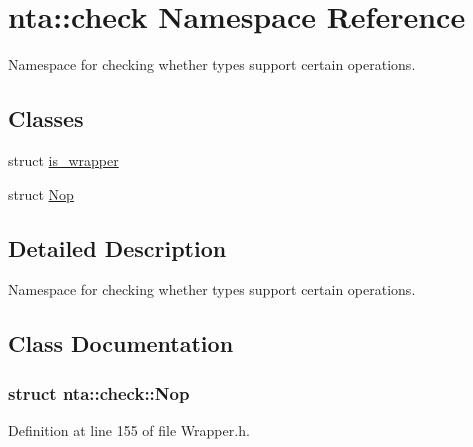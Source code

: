\hypertarget{namespacenta_1_1check}{}\section{nta\+:\+:check Namespace Reference}
\label{namespacenta_1_1check}


Namespace for checking whether types support certain operations.  


\subsection*{Classes}
\begin{DoxyCompactItemize}
\item 
struct \hyperlink{structnta_1_1check_1_1is__wrapper}{is\+\_\+wrapper}
\item 
struct \hyperlink{namespacenta_1_1check_de/d20/structnta_1_1check_1_1Nop}{Nop}
\end{DoxyCompactItemize}


\subsection{Detailed Description}
Namespace for checking whether types support certain operations. 

\subsection{Class Documentation}
\label{structnta_1_1check_1_1Nop}
\subsubsection{struct nta\+:\+:check\+:\+:Nop}


Definition at line 155 of file Wrapper.\+h.

